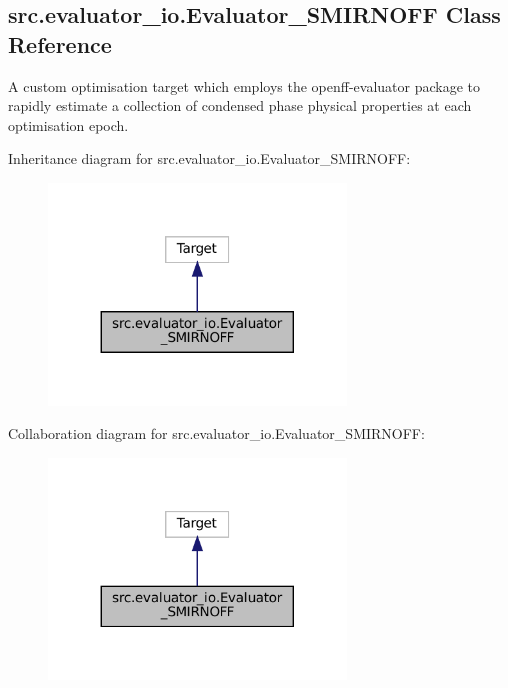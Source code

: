 \hypertarget{classsrc_1_1evaluator__io_1_1Evaluator__SMIRNOFF}{}\subsection{src.\+evaluator\+\_\+io.\+Evaluator\+\_\+\+S\+M\+I\+R\+N\+O\+FF Class Reference}
\label{classsrc_1_1evaluator__io_1_1Evaluator__SMIRNOFF}


A custom optimisation target which employs the {\ttfamily openff-\/evaluator} package to rapidly estimate a collection of condensed phase physical properties at each optimisation epoch.  




Inheritance diagram for src.\+evaluator\+\_\+io.\+Evaluator\+\_\+\+S\+M\+I\+R\+N\+O\+FF\+:
\nopagebreak
\begin{figure}[H]
\begin{center}
\leavevmode
\includegraphics[width=224pt]{classsrc_1_1evaluator__io_1_1Evaluator__SMIRNOFF__inherit__graph}
\end{center}
\end{figure}


Collaboration diagram for src.\+evaluator\+\_\+io.\+Evaluator\+\_\+\+S\+M\+I\+R\+N\+O\+FF\+:
\nopagebreak
\begin{figure}[H]
\begin{center}
\leavevmode
\includegraphics[width=224pt]{classsrc_1_1evaluator__io_1_1Evaluator__SMIRNOFF__coll__graph}
\end{center}
\end{figure}

